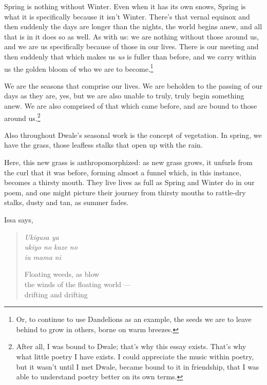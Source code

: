 Spring is nothing without Winter. Even when it has its own snows, Spring is what it is specifically because it isn't Winter. There's that vernal equinox and then suddenly the days are longer than the nights, the world begins anew, and all that is in it does so as well. As with us: we are nothing without those around us, and we are us specifically because of those in our lives. There is our meeting and then suddenly that which makes us \emph{us} is fuller than before, and we carry within us the golden bloom of who we are to become.\footnote{Or, to continue to use Dandelions as an example, the seeds we are to leave behind to grow in others, borne on warm breezes.}

We are the seasons that comprise our lives. We are beholden to the passing of our days as they are, yes, but we are also unable to truly, truly begin something anew. We are also comprised of that which came before, and are bound to those around us.\footnote{After all, I was bound to Dwale; that's why this essay exists. That's why what little poetry I have exists. I could appreciate the music within poetry, but it wasn't until I met Dwale, became bound to it in friendship, that I was able to understand poetry better on its own terms.}

Also throughout Dwale's seasonal work is the concept of vegetation. In spring, we have the grass, those leafless stalks that open up with the rain.

Here, this new grass is anthropomorphized: as new grass grows, it unfurls from the curl that it was before, forming almost a funnel which, in this instance, becomes a thirsty mouth. They live lives as full as Spring and Winter do in our poem, and one might picture their journey from thirsty mouths to rattle-dry stalks, dusty and tan, as summer fades.

Issa says,

\begin{verse}
\begin{multicols}{2}
\emph{Ukigusa ya} \\
\emph{ukiyo no kaze no} \\
\emph{iu mama ni}

\columnbreak

Floating weeds, as blow \\
the winds of the floating world --- \\
drifting and drifting
\end{multicols}
\vspace{-1em}
\parencite[18]{issa}
\end{verse}

